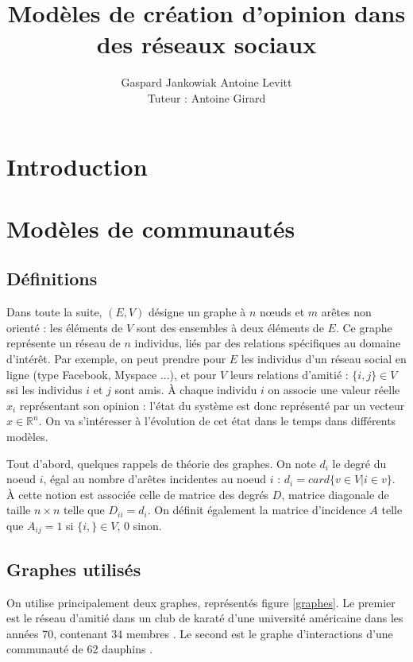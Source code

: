 \documentclass[12pt]{article}
\newcommand{\R}{\mathbb{R}}
\begin{document}
\author{Gaspard Jankowiak \quad Antoine Levitt\\ Tuteur : Antoine Girard}
\title{Modèles de création d'opinion dans des réseaux sociaux}
\maketitle
{}
\tableofcontents
\newpage
\section{Introduction}
\section{Modèles de communautés}
\subsection{Définitions}
Dans toute la suite, $(E, V)$ désigne un graphe à $n$ n\oe uds et $m$
arêtes non orienté : les éléments de $V$ sont des ensembles à deux
éléments de $E$. Ce graphe représente un réseau de $n$ individus, liés
par des relations spécifiques au domaine d'intérêt. Par exemple, on
peut prendre pour $E$ les individus d'un réseau social en ligne (type
Facebook, Myspace ...), et pour $V$ leurs relations d'amitié : $\{i, j\}
\in V$ ssi les individus $i$ et $j$ sont amis. À chaque individu $i$
on associe une valeur réelle $x_i$ représentant son opinion : l'état
du système est donc représenté par un vecteur $x \in \R^n$. On va
s'intéresser à l'évolution de cet état dans le temps dans différents
modèles.

Tout d'abord, quelques rappels de théorie des graphes. On note $d_i$
le degré du noeud $i$, égal au nombre d'arêtes incidentes au noeud $i$
: $d_i = card \{v \in V | i \in v\}$. À cette notion est associée
  celle de matrice des degrés $D$, matrice diagonale de taille $n
  \times n$ telle que $D_{i i} = d_i$. On définit également la matrice
  d'incidence $A$ telle que $A_{i j} = 1$ si $\{i, \} \in V$, $0$
  sinon.

\subsection{Graphes utilisés}
On utilise principalement deux graphes, représentés figure
\ref{graphes}.  Le premier est le réseau d'amitié dans un club de
karaté d'une université américaine dans les années 70, contenant 34
membres \cite{zachary}. Le second est le graphe d'interactions d'une
communauté de 62 dauphins \cite{dolphins}.
\end{document}
